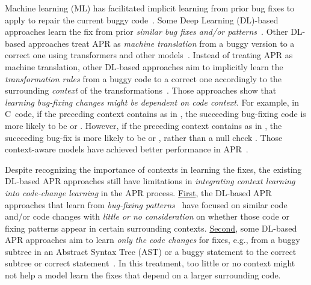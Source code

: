 Machine learning (ML)
has facilitated implicit learning from prior bug fixes to apply to repair
the current buggy
code~\cite{long2016automatic,long2017automatic,saha2017elixir}.
Some Deep Learning (DL)-based approaches learn the fix from prior {\em
  similar bug fixes and/or
  patterns}~\cite{gupta2017deepfix,white2019sorting,white2016deep}.
Other DL-based approaches treat APR as {\em machine translation} from
a buggy version to a correct one using transformers and other
models~\cite{chakrabortycodit,chen2018sequencer,hata2018learning,tufano2018empirical,see2017get}. Instead
of treating APR as machine translation, other DL-based approaches aim
to implicitly learn the {\em transformation rules} from a buggy code
to a correct one accordingly to the surrounding {\em context} of the
transformations~\cite{chen2018sequencer,icse20,cure-icse21,lutellier2020coconut}.
Those approaches show that {\em learning bug-fixing changes might 
  be dependent on {\em code context}}. For example, in
C~code, if the preceding context contains  as in
, the succeeding
bug-fixing code is more likely to be  or
. However, if the preceding context contains
 as in , the
succeeding bug-fix is more likely to be  or
, rather than a null check .
Those context-aware models have achieved better performance in
APR~\cite{icse20,lutellier2020coconut,cure-icse21}.


Despite recognizing the importance of contexts in learning the fixes,
the existing DL-based APR approaches still have limitations in {\em
  integrating context learning into code-change learning} in the APR
process. \underline{First}, the DL-based APR approaches that learn
from {\em bug-fixing patterns}~\cite{white2016deep,gupta2017deepfix}
have focused on similar code and/or code changes with {\em little or
  no consideration} on whether those code or fixing patterns appear in
certain surrounding contexts. \underline{Second}, some DL-based APR
approaches aim to learn {\em only the code changes} for fixes, e.g.,
from a buggy subtree in an Abstract Syntax Tree (AST) or a buggy
statement to the correct subtree or correct
statement~\cite{chakrabortycodit,see2017get}. In this treatment, too
little or no context might not help a model learn the fixes that
depend on a larger surrounding code.

